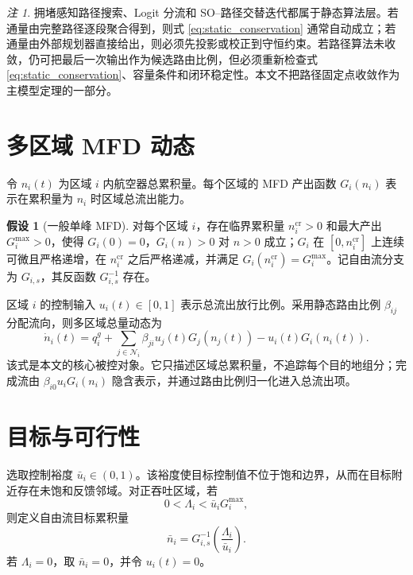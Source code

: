 \documentclass[a4paper,12pt]{article}
\theoremstyle{plain}
\theoremstyle{definition}
\newtheorem{assumption}[theorem]{假设}
\theoremstyle{remark}
\newtheorem{remark}[theorem]{注}
\begin{document}
\begin{remark}
拥堵感知路径搜索、Logit 分流和 SO--路径交替迭代都属于静态算法层。若通量由完整路径逐段聚合得到，则式 \eqref{eq:static_conservation} 通常自动成立；若通量由外部规划器直接给出，则必须先投影或校正到守恒约束。若路径算法未收敛，仍可把最后一次输出作为候选路由比例，但必须重新检查式 \eqref{eq:static_conservation}、容量条件和闭环稳定性。本文不把路径固定点收敛作为主模型定理的一部分。
\end{remark}

\section{多区域 MFD 动态}

令 $n_i(t)$ 为区域 $i$ 内航空器总累积量。每个区域的 MFD 产出函数 $G_i(n_i)$ 表示在累积量为 $n_i$ 时区域总流出能力。

\begin{assumption}[一般单峰 MFD]\label{asm:mfd}
对每个区域 $i$，存在临界累积量 $n_i^{\mathrm{cr}}>0$ 和最大产出 $G_i^{\max}>0$，使得 $G_i(0)=0$，$G_i(n)>0$ 对 $n>0$ 成立；$G_i$ 在 $[0,n_i^{\mathrm{cr}}]$ 上连续可微且严格递增，在 $n_i^{\mathrm{cr}}$ 之后严格递减，并满足 $G_i(n_i^{\mathrm{cr}})=G_i^{\max}$。记自由流分支为 $G_{i,s}$，其反函数 $G_{i,s}^{-1}$ 存在。
\end{assumption}

区域 $i$ 的控制输入 $u_i(t)\in[0,1]$ 表示总流出放行比例。采用静态路由比例 $\beta_{ij}$ 分配流向，则多区域总量动态为
\begin{equation}\label{eq:dynamics}
    \dot n_i(t)
    =
    q_i^g
    +
    \sum_{j\in\mathcal N_i}\beta_{ji}u_j(t)G_j(n_j(t))
    -
    u_i(t)G_i(n_i(t)).
\end{equation}
该式是本文的核心被控对象。它只描述区域总累积量，不追踪每个目的地组分；完成流由 $\beta_{i0}u_iG_i(n_i)$ 隐含表示，并通过路由比例归一化进入总流出项。

\section{目标与可行性}

选取控制裕度 $\bar u_i\in(0,1)$。该裕度使目标控制值不位于饱和边界，从而在目标附近存在未饱和反馈邻域。对正吞吐区域，若
\begin{equation}\label{eq:capacity}
    0<\Lambda_i<\bar u_iG_i^{\max},
\end{equation}
则定义自由流目标累积量
\begin{equation}\label{eq:target}
    \bar n_i
    =
    G_{i,s}^{-1}\left(\frac{\Lambda_i}{\bar u_i}\right).
\end{equation}
若 $\Lambda_i=0$，取 $\bar n_i=0$，并令 $u_i(t)=0$。
\end{document}
